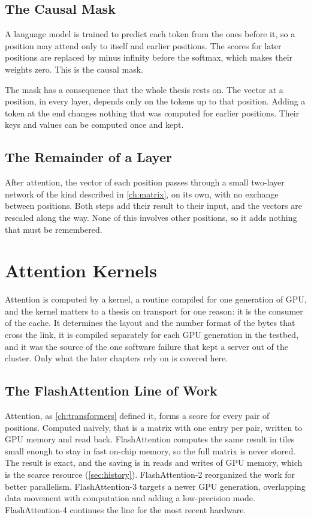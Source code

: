 \subsection{The Causal Mask}

A language model is trained to predict each token from the ones before it, so
a position may attend only to itself and earlier positions. The scores for
later positions are replaced by minus infinity before the softmax, which
makes their weights zero. This is the causal mask.

The mask has a consequence that the whole thesis rests on. The vector at a
position, in every layer, depends only on the tokens up to that position.
Adding a token at the end changes nothing that was computed for earlier
positions. Their keys and values can be computed once and kept.

\subsection{The Remainder of a Layer}

After attention, the vector of each position passes through a small two-layer network of the kind described in \cref{ch:matrix}, on its own, with no
exchange between positions. Both steps add their result to their input, and
the vectors are rescaled along the way. None of this involves other
positions, so it adds nothing that must be remembered.

\section{Attention Kernels}
\label{ch:kernels}

Attention is computed by a kernel, a routine compiled for one generation of
GPU, and the kernel matters to a thesis on transport for one reason: it is
the consumer of the cache. It determines the layout and the number format of
the bytes that cross the link, it is compiled separately for each GPU
generation in the testbed, and it was the source of the one software failure
that kept a server out of the cluster. Only what the later chapters rely on
is covered here.

\subsection{The FlashAttention Line of Work}

Attention, as \cref{ch:transformers} defined it, forms a score for every pair
of positions. Computed naively, that is a matrix with one entry per pair,
written to GPU memory and read back. FlashAttention \citep{dao2022fa1}
computes the same result in tiles small enough to stay in fast on-chip
memory, so the full matrix is never stored. The result is exact, and the
saving is in reads and writes of GPU memory, which is the scarce resource
(\cref{sec:history}). FlashAttention-2 \citep{dao2023fa2} reorganized the work
for better parallelism. FlashAttention-3 \citep{shah2024fa3} targets a newer
GPU generation, overlapping data movement with computation and adding a
low-precision mode. FlashAttention-4 \citep{zadouri2026fa4} continues the
line for the most recent hardware.

